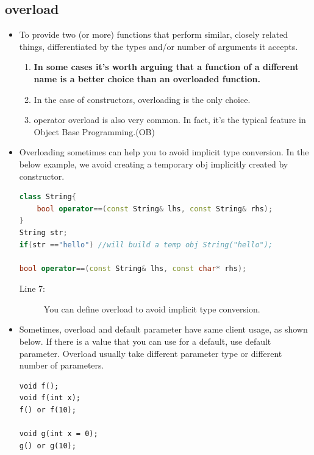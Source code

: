 \documentclass[a4paper,11pt,twoside]{book}
\begin{document}
\subsection{overload}
\begin{itemize}
 
	\item To provide two (or more) functions that perform similar, closely related things, differentiated by the types and/or number of arguments it accepts.
	
	\begin{enumerate}
		\item \textbf{In some cases it's worth arguing that a function of a different name is a better choice than an overloaded function.}
		
		\item  In the case of constructors, overloading is the only choice.
		
		\item  operator overload is also very common. In fact, it's the typical feature in Object Base Programming.(OB)
	\end{enumerate}
	
	\item Overloading sometimes can help you to avoid implicit type conversion. In the below example, we avoid creating a temporary obj implicitly created by constructor.
	
\begin{lstlisting}[frame=single, language=c++]
class String{
	bool operator==(const String& lhs, const String& rhs);
}
String str;
if(str =="hello") //will build a temp obj String("hello");
	
bool operator==(const String& lhs, const char* rhs);
\end{lstlisting}
\begin{description}
	\item[Line 7:] You can define overload to avoid implicit type conversion.
\end{description}

	
	\item Sometimes, overload and default parameter have same client usage, as shown below. If there is a value that you can use for a default, use default parameter. Overload usually take different parameter type or different number of parameters.
\begin{lstlisting}[numbers=none]
void f();
void f(int x);
f() or f(10);
	
void g(int x = 0);
g() or g(10);
\end{lstlisting}
	

\end{itemize}
\end{document}
